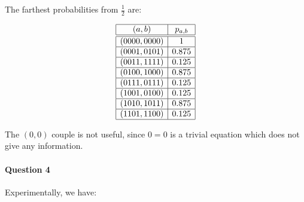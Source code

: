 \documentclass[a4paper]{article}
\begin{document}
The farthest probabilities from $\frac{1}{2}$ are:

\begin{equation*}
\begin{array}{|c|c|}
\hline
(a,b) & p_{a,b} \\
\hline
\hline
(0000,0000) & 1 \\
\hline
(0001,0101) & 0.875 \\
\hline
(0011,1111) & 0.125 \\
\hline
(0100,1000) & 0.875 \\
\hline
(0111,0111) & 0.125 \\
\hline
(1001,0100) & 0.125 \\
\hline
(1010,1011) & 0.875 \\
\hline
(1101,1100) & 0.125 \\
\hline
\end{array}
\end{equation*}

The $(0,0)$ couple is not useful, since $0=0$ is a trivial equation which does not give any information.

\paragraph{Question 4}

Experimentally, we have:
\end{document}
